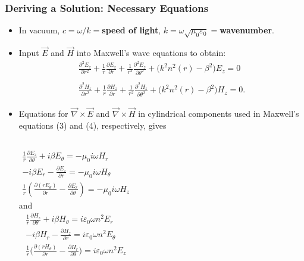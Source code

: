 \documentclass{beamer}
\begin{document}
\begin{frame}
\frametitle{\textbf{Deriving a Solution:} Necessary Equations}
\vspace{-2mm}\begin{itemize}
\item In vacuum, $c=\omega\slash k=$\textbf{speed of light}, $k=\omega\sqrt{\mu_0\varepsilon_0}=$\textbf{wavenumber}.
\item Input $\vec{E}$ and $\vec{H}$ into Maxwell's wave equations to obtain:
\begin{gather}
\frac{\partial^{2}E_{z}}{\partial r^2}+\frac{1}{r}\frac{\partial E_z}{\partial r}+\frac{1}{r^{2}}\frac{\partial^{2}E_z}{\partial\theta^2}+\big( k^{2}n^2(r)-\beta^{2}\big) E_z =0\\
\nonumber\\
\frac{\partial^{2}H_{z}}{\partial r^2}+\frac{1}{r}\frac{\partial H_z}{\partial r}+\frac{1}{r^{2}}\frac{\partial^{2}H_z}{\partial\theta^2}+\big( k^{2}n^2(r)-\beta^{2}\big) H_z =0.
\end{gather}
\item Equations for $\vec{\nabla}\times\vec{E}$ and $\vec{\nabla}\times\vec{H}$ in cylindrical components used in Maxwell's equations (3) and (4), respectively, gives
\vspace{-1mm}
\begin{columns}
\begin{gather}
\frac{1}{r}\frac{\partial E_z}{\partial\theta}+i\beta E_{\theta}=-\mu_{0} i\omega H_r\nonumber\\
-i\beta E_r -\frac{\partial E_z}{\partial r}=-\mu_{0} i\omega H_{\theta}\nonumber\\
\frac{1}{r}\left(\frac{\partial (rE_{\theta})}{\partial r} -\frac{\partial E_r}{\partial\theta}\right)=-\mu_{0} i\omega H_z\nonumber
\end{gather}
and
\begin{gather}
\frac{1}{r}\frac{\partial H_z}{\partial\theta}+i\beta H_{\theta}=i\varepsilon_{0}\omega n^2 E_r\nonumber\\
-i\beta H_r -\frac{\partial H_z}{\partial r}=i\varepsilon_{0}\omega n^2 E_{\theta}\nonumber\\
\frac{1}{r}\bigg(\frac{\partial (rH_{\theta})}{\partial r} -\frac{\partial H_r}{\partial\theta}\bigg)=i\varepsilon_{0}\omega n^2 E_z\nonumber
\end{gather}
\end{columns}
\vspace{2mm}

\end{itemize}
\end{frame}
\end{document}
